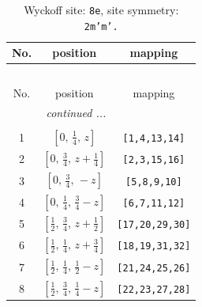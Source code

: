 \documentclass[fleqn,8pt]{jsarticle}
\begin{document}
\begin{longtable}{ccc}
\caption{Wyckoff site: {\tt 8e}, site symmetry: {\tt 2m'm'.}}
 \\
 \hline \hline
No. & position & mapping \\ \hline \endfirsthead

\multicolumn{2}{l}{\tablename\ \thetable{}} \\
 \hline \hline
No. & position & mapping \\ \hline \endhead

 \hline \hline
\multicolumn{2}{r}{\footnotesize\it continued ...} \\ \endfoot

 \hline \hline
\multicolumn{2}{r}{} \\ \endlastfoot

1 & $\left[ 0,\, \frac{1}{4},\, z \right]$ & {\tt [1,4,13,14]} \\ \hline
2 & $\left[ 0,\, \frac{3}{4},\, z + \frac{1}{4} \right]$ & {\tt [2,3,15,16]} \\ \hline
3 & $\left[ 0,\, \frac{3}{4},\, - z \right]$ & {\tt [5,8,9,10]} \\ \hline
4 & $\left[ 0,\, \frac{1}{4},\, \frac{3}{4} - z \right]$ & {\tt [6,7,11,12]} \\ \hline
5 & $\left[ \frac{1}{2},\, \frac{3}{4},\, z + \frac{1}{2} \right]$ & {\tt [17,20,29,30]} \\ \hline
6 & $\left[ \frac{1}{2},\, \frac{1}{4},\, z + \frac{3}{4} \right]$ & {\tt [18,19,31,32]} \\ \hline
7 & $\left[ \frac{1}{2},\, \frac{1}{4},\, \frac{1}{2} - z \right]$ & {\tt [21,24,25,26]} \\ \hline
8 & $\left[ \frac{1}{2},\, \frac{3}{4},\, \frac{1}{4} - z \right]$ & {\tt [22,23,27,28]} \\
\end{longtable}
\renewcommand{\arraystretch}{1.2}
\end{document}
